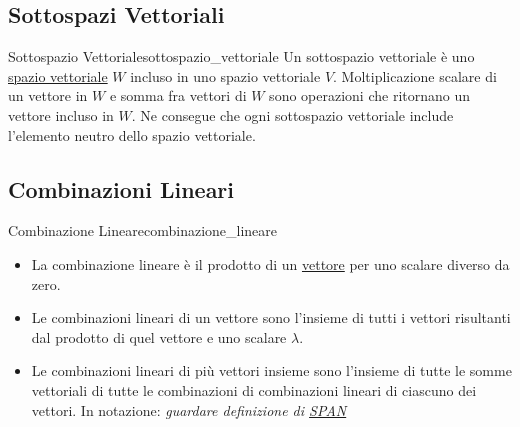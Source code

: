 \documentclass{article}
\begin{document}
\subsection{Sottospazi Vettoriali}

\begin{definition}{Sottospazio Vettoriale}{sottospazio_vettoriale}
    Un sottospazio vettoriale è uno \hyperref[def:spazio_vettoriale]{spazio vettoriale} $W$ incluso in uno spazio vettoriale $V$. Moltiplicazione scalare di un vettore in $W$ e somma fra vettori di $W$ sono operazioni che ritornano un vettore incluso in $W$. Ne consegue che ogni sottospazio vettoriale include l'elemento neutro dello spazio vettoriale.
\end{definition}

\subsection{Combinazioni Lineari}

\begin{definition}{Combinazione Lineare}{combinazione_lineare}
    \begin{itemize}
        \item La combinazione lineare è il prodotto di un \hyperref[def:vettore]{vettore} per uno scalare diverso da zero.
        \item Le combinazioni lineari di un vettore sono l'insieme di tutti i vettori risultanti dal prodotto di quel vettore e uno scalare $\lambda$.
        \item Le combinazioni lineari di più vettori insieme sono l'insieme di tutte le somme vettoriali di tutte le combinazioni di combinazioni lineari di ciascuno dei vettori. In notazione: \it{guardare definizione di \hyperref[def:funzione_span]{SPAN}}
    \end{itemize}
\end{definition}
\end{document}
